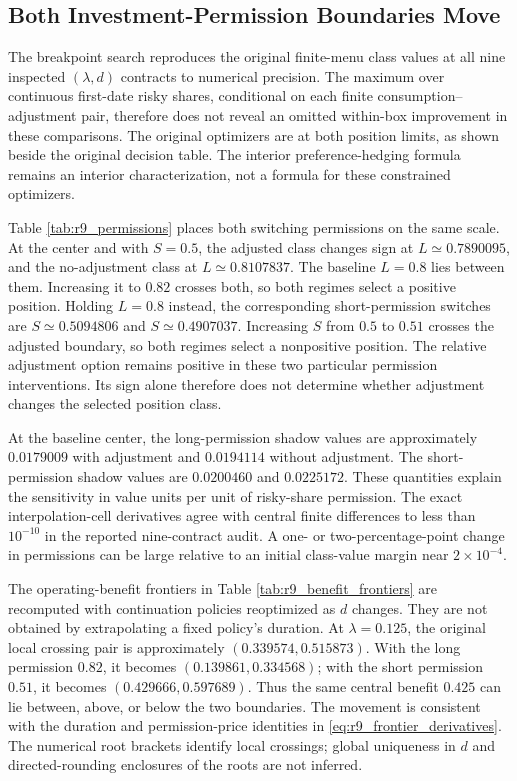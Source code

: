 \subsection{Both Investment-Permission Boundaries Move}

The breakpoint search reproduces the original finite-menu class values at all nine inspected $(\lambda,d)$ contracts to numerical precision. The maximum over continuous first-date risky shares, conditional on each finite consumption--adjustment pair, therefore does not reveal an omitted within-box improvement in these comparisons. The original optimizers are at both position limits, as shown beside the original decision table. The interior preference-hedging formula remains an interior characterization, not a formula for these constrained optimizers.

Table \ref{tab:r9_permissions} places both switching permissions on the same scale. At the center and with $S=0.5$, the adjusted class changes sign at $L\simeq0.7890095$, and the no-adjustment class at $L\simeq0.8107837$. The baseline $L=0.8$ lies between them. Increasing it to $0.82$ crosses both, so both regimes select a positive position. Holding $L=0.8$ instead, the corresponding short-permission switches are $S\simeq0.5094806$ and $S\simeq0.4907037$. Increasing $S$ from $0.5$ to $0.51$ crosses the adjusted boundary, so both regimes select a nonpositive position. The relative adjustment option remains positive in these two particular permission interventions. Its sign alone therefore does not determine whether adjustment changes the selected position class.

At the baseline center, the long-permission shadow values are approximately $0.0179009$ with adjustment and $0.0194114$ without adjustment. The short-permission shadow values are $0.0200460$ and $0.0225172$. These quantities explain the sensitivity in value units per unit of risky-share permission. The exact interpolation-cell derivatives agree with central finite differences to less than $10^{-10}$ in the reported nine-contract audit. A one- or two-percentage-point change in permissions can be large relative to an initial class-value margin near $2\times10^{-4}$.


The operating-benefit frontiers in Table \ref{tab:r9_benefit_frontiers} are recomputed with continuation policies reoptimized as $d$ changes. They are not obtained by extrapolating a fixed policy's duration. At $\lambda=0.125$, the original local crossing pair is approximately $(0.339574,0.515873)$. With the long permission $0.82$, it becomes $(0.139861,0.334568)$; with the short permission $0.51$, it becomes $(0.429666,0.597689)$. Thus the same central benefit $0.425$ can lie between, above, or below the two boundaries. The movement is consistent with the duration and permission-price identities in \eqref{eq:r9_frontier_derivatives}. The numerical root brackets identify local crossings; global uniqueness in $d$ and directed-rounding enclosures of the roots are not inferred.

